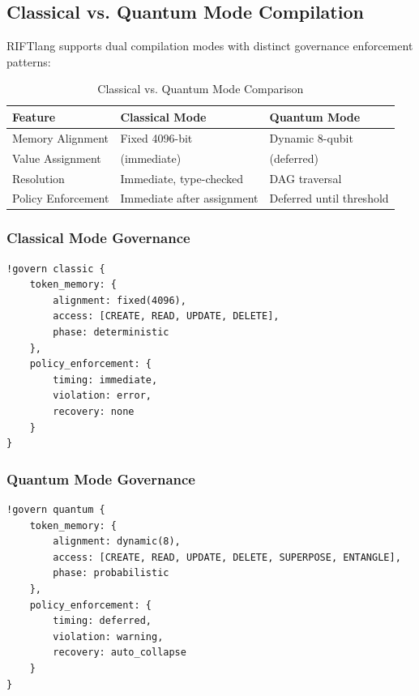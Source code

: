 \subsection{Classical vs. Quantum Mode Compilation}

RIFTlang supports dual compilation modes with distinct governance enforcement patterns:

\begin{table}[h]
\centering
\begin{tabular}{|l|l|l|}
\hline
\textbf{Feature} & \textbf{Classical Mode} & \textbf{Quantum Mode} \\
\hline
Memory Alignment & Fixed 4096-bit & Dynamic 8-qubit \\
Value Assignment & \riftcode{:=} (immediate) & \riftcode{=:} (deferred) \\
Resolution & Immediate, type-checked & DAG traversal \\
Policy Enforcement & Immediate after assignment & Deferred until threshold \\
\hline
\end{tabular}
\caption{Classical vs. Quantum Mode Comparison}
\label{tab:mode_comparison}
\end{table}

\subsubsection{Classical Mode Governance}

\begin{lstlisting}[style=riftlang, language=rift]
!govern classic {
    token_memory: {
        alignment: fixed(4096),
        access: [CREATE, READ, UPDATE, DELETE],
        phase: deterministic
    },
    policy_enforcement: {
        timing: immediate,
        violation: error,
        recovery: none
    }
}
\end{lstlisting}

\subsubsection{Quantum Mode Governance}

\begin{lstlisting}[style=riftlang, language=rift]
!govern quantum {
    token_memory: {
        alignment: dynamic(8),
        access: [CREATE, READ, UPDATE, DELETE, SUPERPOSE, ENTANGLE],
        phase: probabilistic
    },
    policy_enforcement: {
        timing: deferred,
        violation: warning,
        recovery: auto_collapse
    }
}
\end{lstlisting}

